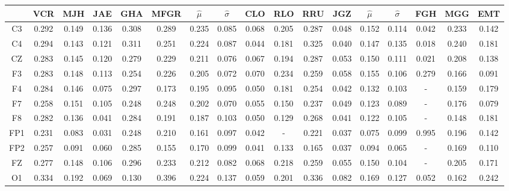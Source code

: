 \begin{SidewaysFigure}
\centering
\begin{tabular}{c||ccccc|cc||cccc|cc||ccc}
& VCR & MJH & JAE & GHA & MFGR &$\widehat{\mu}$ & $\widehat{\sigma}$
& CLO & RLO & RRU & JGZ &$\widehat{\mu}$ & $\widehat{\sigma}$
& FGH & MGG & EMT \\
\hline
 C3 & 0.292    & 0.149    & 0.136    & 0.308    & 0.289    & 0.235    & 0.085    & 0.068    & 0.205    & 0.287    & 0.048    & 0.152    & 0.114    & 0.042    & 0.233    & 0.142     \\
 C4 & 0.294    & 0.143    & 0.121    & 0.311    & 0.251    & 0.224    & 0.087    & 0.044    & 0.181    & 0.325    & 0.040    & 0.147    & 0.135    & 0.018    & 0.240    & 0.181     \\
 CZ & 0.283    & 0.145    & 0.120    & 0.279    & 0.229    & 0.211    & 0.076    & 0.067    & 0.194    & 0.287    & 0.053    & 0.150    & 0.111    & 0.021    & 0.208    & 0.138     \\
 F3 & 0.283    & 0.148    & 0.113    & 0.254    & 0.226    & 0.205    & 0.072    & 0.070    & 0.234    & 0.259    & 0.058    & 0.155    & 0.106    & 0.279    & 0.166    & 0.091     \\
 F4 & 0.284    & 0.146    & 0.075    & 0.297    & 0.173    & 0.195    & 0.095    & 0.050    & 0.181    & 0.254    & 0.042    & 0.132    & 0.103    & -      & 0.159    & 0.179     \\
 F7 & 0.258    & 0.151    & 0.105    & 0.248    & 0.248    & 0.202    & 0.070    & 0.055    & 0.150    & 0.237    & 0.049    & 0.123    & 0.089    & -      & 0.176    & 0.079     \\
 F8 & 0.282    & 0.136    & 0.041    & 0.284    & 0.191    & 0.187    & 0.103    & 0.050    & 0.129    & 0.268    & 0.041    & 0.122    & 0.105    & -      & 0.148    & 0.181     \\
 FP1 & 0.231    & 0.083    & 0.031    & 0.248    & 0.210    & 0.161    & 0.097    & 0.042    & -      & 0.221    & 0.037    & 0.075    & 0.099    & 0.995    & 0.196    & 0.142     \\
 FP2 & 0.257    & 0.091    & 0.060    & 0.285    & 0.155    & 0.170    & 0.099    & 0.041    & 0.133    & 0.165    & 0.037    & 0.094    & 0.065    & -      & 0.169    & 0.110     \\
 FZ & 0.277    & 0.148    & 0.106    & 0.296    & 0.233    & 0.212    & 0.082    & 0.068    & 0.218    & 0.259    & 0.055    & 0.150    & 0.104    & -      & 0.205    & 0.171     \\
 O1 & 0.334    & 0.192    & 0.069    & 0.130    & 0.396    & 0.224    & 0.137    & 0.059    & 0.201    & 0.336    & 0.082    & 0.169    & 0.127    & 0.052    & 0.162    & 0.242     \\

\end{tabular}
\end{SidewaysFigure}
